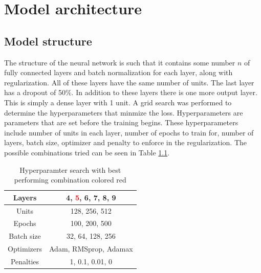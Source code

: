 
\chapter{Model architecture} %

\label{Chapter4} %


\section{Model structure}
The structure of the neural network is such that it contains some number $n$ of fully connected layers and batch normalization for each layer, along with regularization. All of these layers have the same number of units. The last layer has a dropout of 50\%. In addition to these layers there is one more output layer. This is simply a dense layer with 1 unit. A grid search was performed to determine the hyperparameters that minmize the loss. Hyperparameters are parameters that are set before the training begins\cite{hyperparameters_definition}. These hyperparameters include number of units in each layer, number of epochs to train for, number of layers, batch size, optimizer and penalty to enforce in the regularization. The possible combinations tried can be seen in Table \ref{table:gridSearchHyperparamters}.

\begin{table}[h]
    \centering
    \caption{Hyperparamter search with best performing combination colored red}
    \label{table:gridSearchHyperparamters}
    \begin{tabular}{c|c}
        Layers &  4, \textcolor{red}{5}, 6, 7, 8, 9\\\hline
        Units &  128, 256, 512\\\hline
        Epochs & 100, 200, 500\\\hline
        Batch size & 32, 64, 128, 256\\\hline
        Optimizers & Adam, RMSprop, Adamax\\\hline
        Penalties & 1, 0.1, 0.01, 0\\\hline
    \end{tabular}
\end{table}

